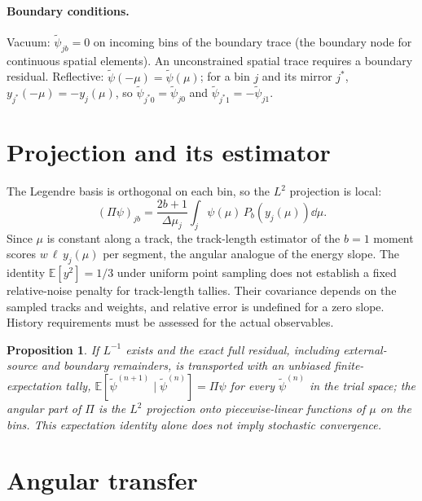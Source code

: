 \documentclass[11pt]{article}
\newtheorem{proposition}{Proposition}
\newcommand{\tpsi}{\tilde\psi}
\newcommand{\E}{\mathbb{E}}
\begin{document}
\paragraph{Boundary conditions.} Vacuum: $\tpsi_{jb}=0$ on incoming bins of the boundary
trace (the boundary node for continuous spatial elements). An unconstrained spatial
trace requires a boundary residual. Reflective: $\tpsi(-\mu)=\tpsi(\mu)$; for a bin $j$ and its mirror $j^*$,
$y_{j^*}(-\mu)=-y_j(\mu)$, so $\tpsi_{j^*0}=\tpsi_{j0}$ and $\tpsi_{j^*1}=-\tpsi_{j1}$.

\section{Projection and its estimator}

The Legendre basis is orthogonal on each bin, so the $L^2$ projection is local:
\begin{equation}
  (\Pi\psi)_{jb} = \frac{2b+1}{\Delta\mu_j}\int_j \psi(\mu)\,P_b(y_j(\mu))\dd\mu .
\end{equation}
Since $\mu$ is constant along a track, the track-length estimator of the $b=1$ moment
scores $w\,\ell\,y_j(\mu)$ per segment, the angular analogue of the energy slope.
The identity $\E[y^2]=1/3$ under uniform point sampling does not establish a fixed
relative-noise penalty for track-length tallies. Their covariance depends on the
sampled tracks and weights, and relative error is undefined for a zero slope.
History requirements must be assessed for the actual observables.

\begin{proposition}
If $L^{-1}$ exists and the exact full residual, including external-source and
boundary remainders, is transported with an unbiased finite-expectation tally,
$\E[\tpsi^{(n+1)}\mid\tpsi^{(n)}]=\Pi\psi$ for every $\tpsi^{(n)}$ in
the trial space; the angular part of $\Pi$ is the $L^2$ projection onto piecewise-linear
functions of $\mu$ on the bins. This expectation identity alone does not imply
stochastic convergence.
\end{proposition}

\section{Angular transfer}
\end{document}
